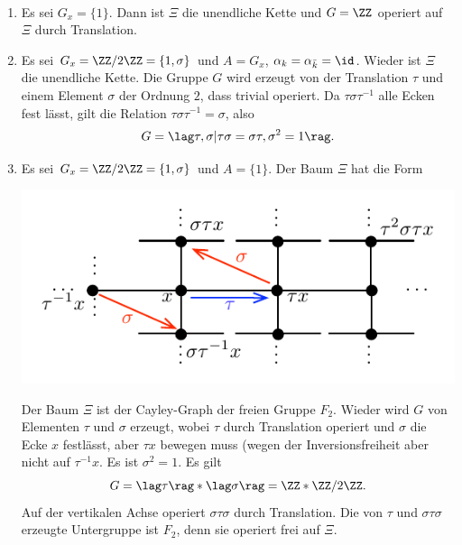 \BSP\
\begin{enumerate}
\item Es sei $G_x=\{1\}$. Dann ist $\Xi$ die unendliche Kette
und $G=\ZZ$ operiert auf $\Xi$ durch Translation.
\item Es sei $G_x=\ZZ/2\ZZ=\{1,\sigma\}$ und $A=G_x$,
$\alpha_k=\alpha_{\bar{k}}=\id$. Wieder ist $\Xi$ die
unendliche Kette. Die Gruppe $G$ wird erzeugt von der
Translation $\tau$ und einem Element $\sigma$ der Ordnung $2$,
dass trivial operiert.
Da $\tau\sigma\tau^{-1}$ alle Ecken fest lässt, gilt die Relation
$\tau\sigma\tau^{-1}=\sigma$, also
\[
G = \lag \tau,\sigma | \tau\sigma=\sigma\tau, \sigma^2=1 \rag.
\]
\item Es sei $G_x=\ZZ/2\ZZ=\{1,\sigma\}$ und $A=\{1\}$.
Der Baum $\Xi$ hat die Form
\begin{center}
	\includegraphics{grugraImages/XiF2}
\end{center}
Der Baum $\Xi$ ist der
Cayley-Graph der freien Gruppe $F_2$.
Wieder wird $G$ von Elementen $\tau$ und $\sigma$ erzeugt, wobei
$\tau$ durch Translation operiert und $\sigma$ die Ecke $x$
festlässt, aber $\tau x$ bewegen muss (wegen der Inversionsfreiheit
aber nicht auf $\tau^{-1} x$.
Es ist $\sigma^2=1$. Es gilt
\[
G = \lag \tau \rag * \lag \sigma \rag
= \ZZ * \ZZ/2\ZZ.
\]
Auf der vertikalen Achse operiert $\sigma\tau\sigma$ durch
Translation. Die von $\tau$ und $\sigma\tau\sigma$ erzeugte
Untergruppe ist $F_2$, denn sie operiert frei auf $\Xi$.
\end{enumerate}

